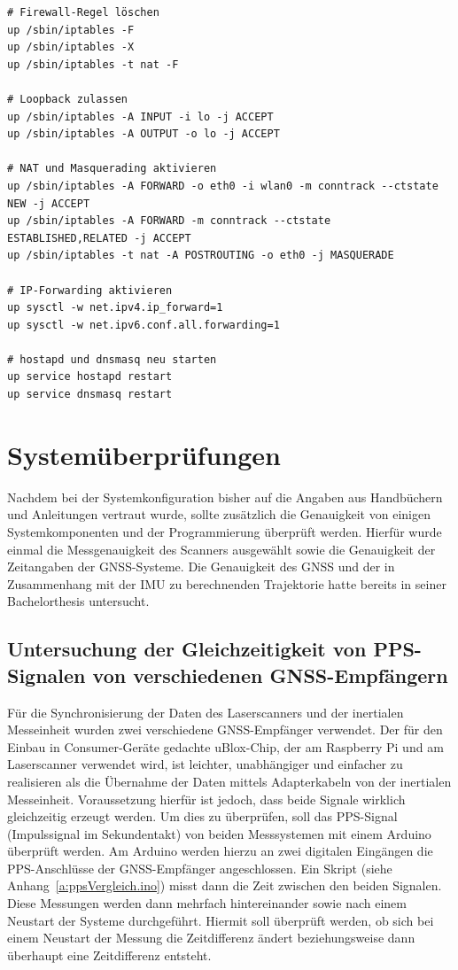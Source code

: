 \documentclass[a4paper,12pt,bibliography=totoc, listof=totoc,titlepage,pointlessnumbers]{scrreprt}
\newcommand*\justify{%
  \fontdimen2\font=0.4em%
  \fontdimen3\font=0.2em%
  \fontdimen4\font=0.1em%
  \fontdimen7\font=0.1em%
  \hyphenchar\font=`\-%
}
\newcommand{\code}[1]{\texttt{\justify{#1}}}
\begin{document}

\begin{lstlisting}[caption={Erweiterung der \code{/etc/network/interfaces} zur Nutzung als Router}, label={router}]
# Firewall-Regel löschen
up /sbin/iptables -F
up /sbin/iptables -X
up /sbin/iptables -t nat -F

# Loopback zulassen
up /sbin/iptables -A INPUT -i lo -j ACCEPT
up /sbin/iptables -A OUTPUT -o lo -j ACCEPT

# NAT und Masquerading aktivieren
up /sbin/iptables -A FORWARD -o eth0 -i wlan0 -m conntrack --ctstate NEW -j ACCEPT
up /sbin/iptables -A FORWARD -m conntrack --ctstate ESTABLISHED,RELATED -j ACCEPT
up /sbin/iptables -t nat -A POSTROUTING -o eth0 -j MASQUERADE

# IP-Forwarding aktivieren
up sysctl -w net.ipv4.ip_forward=1
up sysctl -w net.ipv6.conf.all.forwarding=1

# hostapd und dnsmasq neu starten
up service hostapd restart
up service dnsmasq restart
\end{lstlisting}


\chapter{Systemüberprüfungen}
\label{c:systemueberpruefung}
Nachdem bei der Systemkonfiguration bisher auf die Angaben aus Handbüchern und Anleitungen vertraut wurde, sollte zusätzlich die Genauigkeit von einigen Systemkomponenten und der Programmierung überprüft werden. Hierfür wurde einmal die Messgenauigkeit des Scanners ausgewählt sowie die Genauigkeit der Zeitangaben der GNSS-Systeme. Die Genauigkeit des GNSS und der in Zusammenhang mit der IMU zu berechnenden Trajektorie hatte bereits \citet{wilken} in seiner Bachelorthesis untersucht.

\section{Untersuchung der Gleichzeitigkeit von PPS-Signalen von verschiedenen GNSS-Empfängern}
Für die Synchronisierung der Daten des Laser\-scan\-ners und der inertialen Messeinheit wurden zwei verschiedene GNSS-Empfänger verwendet. Der für den Einbau in Consumer-Geräte gedachte uBlox-Chip, der am Rasp\-berry Pi und am Laser\-scan\-ner verwendet wird, ist leichter, unabhängiger und einfacher zu realisieren als die Übernahme der Daten mittels Adapterkabeln von der inertialen Messeinheit. Voraussetzung hierfür ist jedoch, dass beide Signale wirklich gleichzeitig erzeugt werden. Um dies zu überprüfen, soll das PPS-Signal (Impulssignal im Sekundentakt) von beiden Messsystemen mit einem Arduino überprüft werden.
Am Arduino werden hierzu an zwei digitalen Eingängen die PPS-Anschlüsse der GNSS-Empfänger angeschlossen. Ein Skript (siehe Anhang~\ref{a:ppsVergleich.ino}) misst dann die Zeit zwischen den beiden Signalen. Diese Messungen werden dann mehrfach hintereinander sowie nach einem Neustart der Systeme durchgeführt. Hiermit soll überprüft werden, ob sich bei einem Neustart der Messung die Zeitdifferenz ändert beziehungsweise dann überhaupt eine Zeitdifferenz entsteht.
\end{document}

